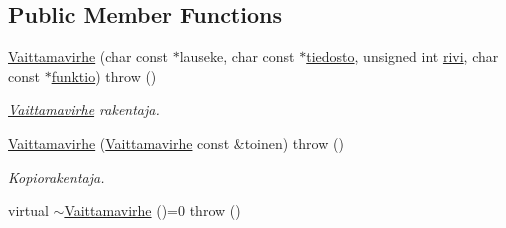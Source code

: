 \subsection*{Public Member Functions}
\begin{DoxyCompactItemize}
\item 
\hyperlink{class_julkinen_1_1_vaittamavirhe_a7c6e81b7fdab0248569dc4f68c056361}{Vaittamavirhe} (char const $\ast$lauseke, char const $\ast$\hyperlink{class_julkinen_1_1_vaittamavirhe_a8624cd880b8466188ef6de480431dffb}{tiedosto}, unsigned int \hyperlink{class_julkinen_1_1_vaittamavirhe_abc571141231b3fa789ae41d2d80642ef}{rivi}, char const $\ast$\hyperlink{class_julkinen_1_1_vaittamavirhe_afd5de6b5639336288d28fd077c84a20c}{funktio})  throw ()
\begin{DoxyCompactList}\small\item\em \hyperlink{class_julkinen_1_1_vaittamavirhe}{Vaittamavirhe} rakentaja. \end{DoxyCompactList}\item 
\hyperlink{class_julkinen_1_1_vaittamavirhe_aeea3649f8099e62d6b3dfce35be555be}{Vaittamavirhe} (\hyperlink{class_julkinen_1_1_vaittamavirhe}{Vaittamavirhe} const \&toinen)  throw ()
\begin{DoxyCompactList}\small\item\em Kopiorakentaja. \end{DoxyCompactList}\item 
\hypertarget{class_julkinen_1_1_vaittamavirhe_a410a444f63066447821e76f2d54a23e2}{}virtual \hyperlink{class_julkinen_1_1_vaittamavirhe_a410a444f63066447821e76f2d54a23e2}{$\sim$\+Vaittamavirhe} ()=0  throw ()\label{class_julkinen_1_1_vaittamavirhe_a410a444f63066447821e76f2d54a23e2}


\end{DoxyCompactItemize}
